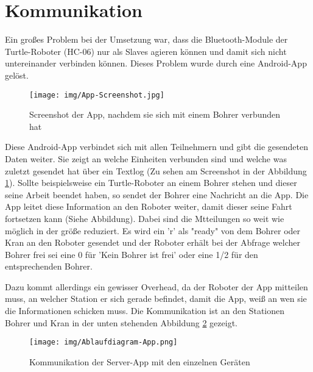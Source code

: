 \section{Kommunikation}
Ein großes Problem bei der Umsetzung war, dass die Bluetooth-Module der Turtle-Roboter (HC-06) nur als Slaves agieren können und damit sich nicht untereinander verbinden können. Dieses Problem wurde durch eine Android-App gelöst.
\begin{figure}[h]
\begin{center}
\texttt{[image: img/App-Screenshot.jpg]}
\caption{Screenshot der App, nachdem sie sich mit einem Bohrer verbunden hat}\label{screen_app}
\end{center}
\end{figure}

Diese Android-App verbindet sich mit allen Teilnehmern und gibt die gesendeten Daten weiter. Sie zeigt an welche Einheiten verbunden sind und welche was zuletzt gesendet hat über ein Textlog (Zu sehen am Screenshot in der Abbildung \ref{screen_app}). Sollte beispielsweise ein Turtle-Roboter an einem Bohrer stehen und dieser seine Arbeit beendet haben, so sendet der Bohrer eine Nachricht an die App. Die App leitet diese Information an den Roboter weiter, damit dieser seine Fahrt fortsetzen kann (Siehe Abbildung). Dabei sind die Mtteilungen so weit wie möglich in der größe reduziert. Es wird ein 'r' als "ready" von dem Bohrer oder Kran an den Roboter gesendet und der Roboter erhält bei der Abfrage welcher Bohrer frei sei eine 0 für 'Kein Bohrer ist frei' oder eine 1/2 für den entsprechenden Bohrer.

Dazu kommt allerdings ein gewisser Overhead, da der Roboter der App mitteilen muss, an welcher Station er sich gerade befindet, damit die App, weiß an wen sie die Informationen schicken muss. Die Kommunikation ist an den Stationen Bohrer und Kran in der unten stehenden Abbildung \ref{ablauf_app} gezeigt.
\begin{figure}[h]
\begin{center}
\texttt{[image: img/Ablaufdiagram-App.png]}
\caption{Kommunikation der Server-App mit den einzelnen Geräten} \label{ablauf_app}
\end{center}
\end{figure}